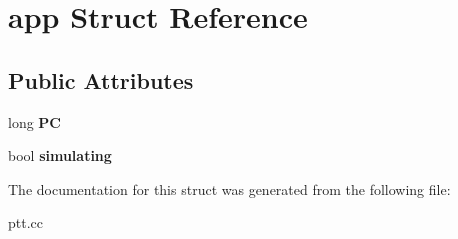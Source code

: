 \hypertarget{structapp}{
\section{app Struct Reference}
\label{structapp}
}
\subsection*{Public Attributes}
\begin{DoxyCompactItemize}
\item 
\hypertarget{structapp_a78260cd49a2b5fb996eaccd48a0e99c7}{
long {\bfseries PC}}
\label{structapp_a78260cd49a2b5fb996eaccd48a0e99c7}

\item 
\hypertarget{structapp_ad56e86d53459ffc454a21f385d7a1f65}{
bool {\bfseries simulating}}
\label{structapp_ad56e86d53459ffc454a21f385d7a1f65}

\end{DoxyCompactItemize}


The documentation for this struct was generated from the following file:\begin{DoxyCompactItemize}
\item 
ptt.cc\end{DoxyCompactItemize}
